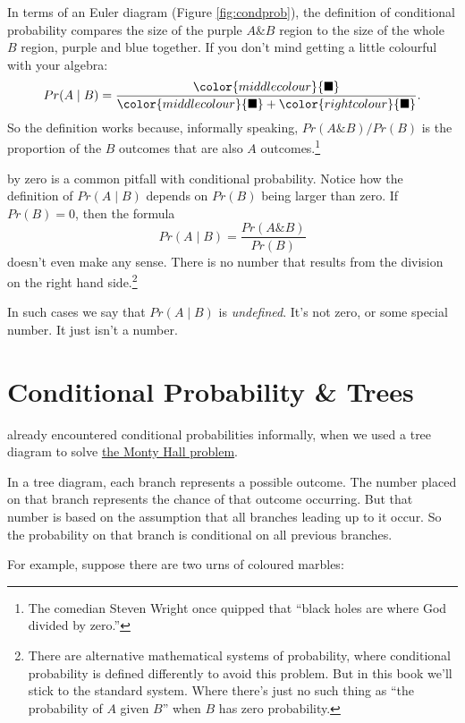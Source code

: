 \documentclass[justified]{tufte-book}
\newcommand{\given}{\mid}
\renewcommand{\wedge}{\mathbin{\&}}
\newcommand{\p}{Pr}
\theoremstyle{definition}
\theoremstyle{definition}
\theoremstyle{definition}
\theoremstyle{remark}
\begin{document}
In terms of an Euler diagram (Figure \ref{fig:condprob}), the definition
of conditional probability compares the size of the purple
\(A \wedge B\) region to the size of the whole \(B\) region, purple and
blue together. If you don't mind getting a little colourful with your
algebra: \[
  \p(A \given B) = \frac{\color{middlecolour}{\blacksquare}}{\color{middlecolour}{\blacksquare} + \color{rightcolour}{\blacksquare}}.
\] So the definition works because, informally speaking,
\(\p(A \wedge B)/\p(B)\) is the proportion of the \(B\) outcomes that
are also \(A\) outcomes.\footnote{The comedian Steven Wright once
  quipped that ``black holes are where God divided by zero.''}

 by zero is a common pitfall with conditional
probability. Notice how the definition of \(\p(A \given B)\) depends on
\(\p(B)\) being larger than zero. If \(\p(B) = 0\), then the formula
\[ \p(A \given B) = \frac{\p(A \wedge B)}{\p(B)} \] doesn't even make
any sense. There is no number that results from the division on the
right hand side.\footnote{There are alternative mathematical systems of
  probability, where conditional probability is defined differently to
  avoid this problem. But in this book we'll stick to the standard
  system. Where there's just no such thing as ``the probability of \(A\)
  given \(B\)'' when \(B\) has zero probability.}

In such cases we say that \(\p(A \given B)\) is \emph{undefined}. It's
not zero, or some special number. It just isn't a number.

\hypertarget{conditional-probability-trees}{%
\section{Conditional Probability \&
Trees}\label{conditional-probability-trees}}

 already encountered conditional probabilities
informally, when we used a tree diagram to solve
\protect\hyperlink{the-monty-hall-problem}{the Monty Hall problem}.

In a tree diagram, each branch represents a possible outcome. The number
placed on that branch represents the chance of that outcome occurring.
But that number is based on the assumption that all branches leading up
to it occur. So the probability on that branch is conditional on all
previous branches.

For example, suppose there are two urns of coloured marbles:
\end{document}
